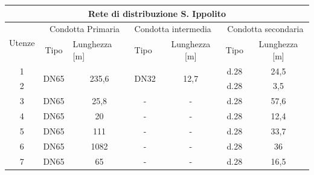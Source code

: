 \documentclass[laurea,oneside,11pt]{USiena_tesiLM}
\begin{document}
\begin{table}[]
\centering
\begin{tabular}{|c|c|c|c|c|c|c|}
\hline
\multicolumn{7}{|c|}{Rete di distribuzione S. Ippolito}                                                                                                                                                       \\ \hline
\multicolumn{1}{|c|}{\multirow{2}{*}{Utenze}} & \multicolumn{2}{c|}{Condotta Primaria}                         & \multicolumn{2}{l|}{Condotta intermedia}          & \multicolumn{2}{c|}{Condotta secondaria} \\ \cline{2-7} 
\multicolumn{1}{|c|}{}                        & Tipo                  & \multicolumn{1}{l|}{Lunghezza {[}m{]}} & \multicolumn{1}{l|}{Tipo} & Lunghezza {[}m{]}     & Tipo         & Lunghezza {[}m{]}         \\ \hline
1                                             & \multirow{2}{*}{DN65} & \multirow{2}{*}{235,6}                 & \multirow{2}{*}{DN32}     & \multirow{2}{*}{12,7} & d.28         & 24,5                      \\ \cline{1-1} \cline{6-7} 
2                                             &                       &                                        &                           &                       & d.28         & 3,5                       \\ \hline
3                                             & DN65                  & 25,8                                   & -                         & -                     & d.28         & 57,6                      \\ \hline
4                                             & DN65                  & 20                                     & -                         & -                     & d.28         & 12,4                      \\ \hline
5                                             & DN65                  & 111                                    & -                         & -                     & d.28         & 33,7                      \\ \hline
6                                             & DN65                  & 1082                                   & -                         & -                     & d.28         & 36                        \\ \hline
7                                             & DN65                  & 65                                     & -                         & -                     & d.28         & 16,5                      \\ \hline

\end{tabular}
\end{table}
\end{document}
